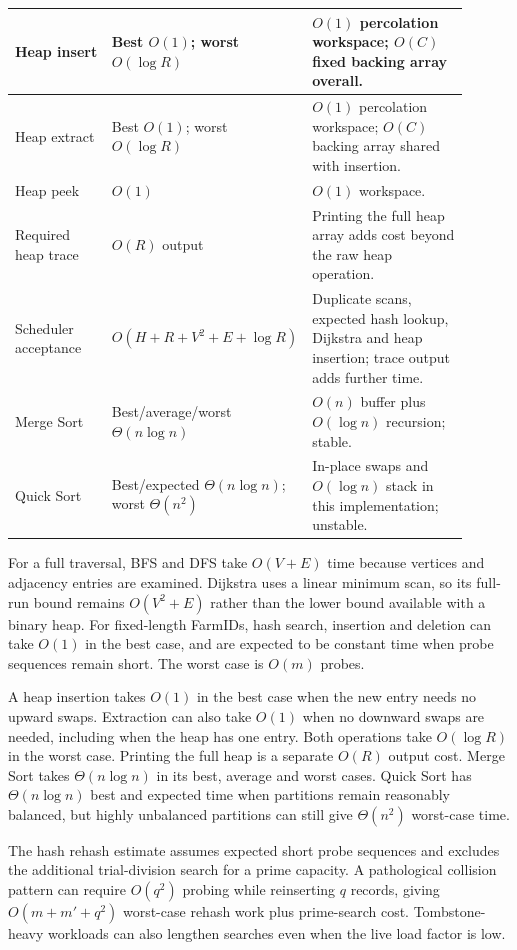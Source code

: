 \documentclass[10pt,a4paper]{article}
\begin{document}
\begin{longtable}{|L{0.25\linewidth}|L{0.21\linewidth}|L{0.44\linewidth}|}
\hline
Heap insert & Best $O(1)$; worst $O(\log R)$ & $O(1)$ percolation workspace; $O(C)$ fixed backing array overall. \\
\hline
Heap extract & Best $O(1)$; worst $O(\log R)$ & $O(1)$ percolation workspace; $O(C)$ backing array shared with insertion. \\
\hline
Heap peek & $O(1)$ & $O(1)$ workspace. \\
\hline
Required heap trace & $O(R)$ output & Printing the full heap array adds cost beyond the raw heap operation. \\
\hline
Scheduler acceptance & $O(H+R+V^2+E+\log R)$ & Duplicate scans, expected hash lookup, Dijkstra and heap insertion; trace output adds further time. \\
\hline
Merge Sort & Best/average/worst $\Theta(n\log n)$ & $O(n)$ buffer plus $O(\log n)$ recursion; stable. \\
\hline
Quick Sort & Best/expected $\Theta(n\log n)$; worst $\Theta(n^2)$ & In-place swaps and $O(\log n)$ stack in this implementation; unstable. \\
\hline
\end{longtable}
\normalsize

For a full traversal, BFS and DFS take $O(V+E)$ time because vertices and adjacency entries are examined. Dijkstra uses a linear minimum scan, so its full-run bound remains $O(V^2+E)$ rather than the lower bound available with a binary heap. For fixed-length FarmIDs, hash search, insertion and deletion can take $O(1)$ in the best case, and are expected to be constant time when probe sequences remain short. The worst case is $O(m)$ probes.

A heap insertion takes $O(1)$ in the best case when the new entry needs no upward swaps. Extraction can also take $O(1)$ when no downward swaps are needed, including when the heap has one entry. Both operations take $O(\log R)$ in the worst case. Printing the full heap is a separate $O(R)$ output cost. Merge Sort takes $\Theta(n\log n)$ in its best, average and worst cases. Quick Sort has $\Theta(n\log n)$ best and expected time when partitions remain reasonably balanced, but highly unbalanced partitions can still give $\Theta(n^2)$ worst-case time.


The hash rehash estimate assumes expected short probe sequences and excludes the additional trial-division search for a prime capacity. A pathological collision pattern can require $O(q^2)$ probing while reinserting $q$ records, giving $O(m+m'+q^2)$ worst-case rehash work plus prime-search cost. Tombstone-heavy workloads can also lengthen searches even when the live load factor is low.
\end{document}
